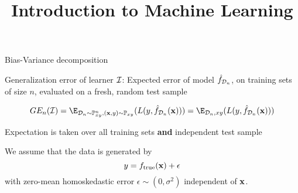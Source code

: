 \documentclass[11pt,compress,t,notes=noshow, xcolor=table]{beamer}
\title{Introduction to Machine Learning}
\begin{document}

\begin{frame}{Bias-Variance decomposition}

Generalization error of learner  $\mathcal{I}$: 
Expected error of model $\hat{f}_{\mathcal{D}_n}$, on training sets of size $n$, evaluated on a fresh, random test sample

$$GE_n(\ind) = \E_{\D_n \sim \Pxy^n, (\xv, y) \sim \Pxy}( L(y, \fh_{\D_n}(\xv)) ) = \E_{\D_n, xy}( L(y, \fh_{\D_n}(\xv)) ) $$

\vfill 

Expectation is taken over all training sets \textbf{and} independent test sample\\

\vfill 

We assume that the data is generated by 
$$
y = f_{\text{true}}(\mathbf{x}) + \epsilon
$$
with zero-mean homoskedastic error $\epsilon \sim (0, \sigma^2)$ independent of $\mathbf{x}$. 

\end{frame}
\end{document}
